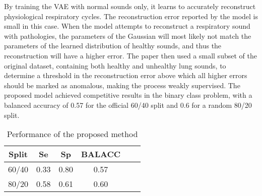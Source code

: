 By training the VAE with normal sounds only, it learns to accurately reconstruct physiological respiratory cycles. The reconstruction error reported by the model is small in this case. When the model attempts to reconstruct a respiratory sound with pathologies, the parameters of the Gaussian will most likely not match the parameters of the learned distribution of healthy sounds, and thus the reconstruction will have a higher error. The paper then used a small subset of the original dataset, containing both healthy and unhealthy lung sounds, to determine a threshold in the reconstruction error above which all higher errors should be marked as anomalous, making the process weakly supervised. The proposed model achieved competitive results in the binary class problem, with a balanced accuracy of 0.57 for the official 60/40 split and 0.6 for a random 80/20 split.

\begin{table}[h!]
    \centering
    \caption{Performance of the proposed method}
    \begin{tabular}{cccccc}
    \toprule
    \textbf{Split} & \textbf{Se} & \textbf{Sp} & \textbf{BALACC} \\
    \midrule
    60/40 & 0.33 & 0.80 & 0.57 \\
    80/20 & 0.58 & 0.61 & 0.60 \\
    \bottomrule
    \end{tabular}
\end{table}


